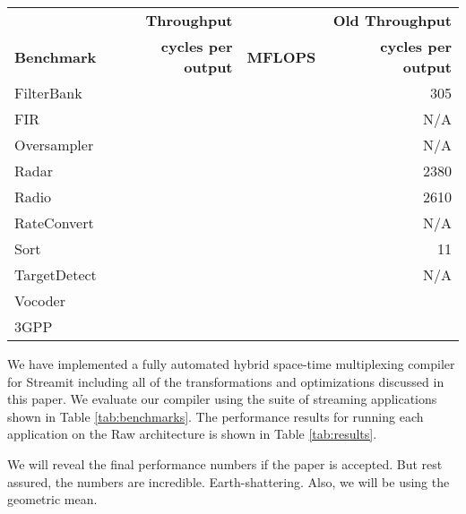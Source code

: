 \begin{table*}[t]
\begin{center}
\scriptsize
\begin{tabular}{|l||r|r||r||}\hline
& {\bf Throughput} &  & {\bf Old Throughput}\\
{\bf Benchmark} &  {\bf cycles per output} & {\bf MFLOPS} &  {\bf cycles per output}\\ 
\hline \hline
FilterBank & & & 305 \\ \hline
FIR & & & N/A\\ \hline
Oversampler & & & N/A \\ \hline
Radar & & & 2380 \\ \hline
Radio & & & 2610 \\ \hline
RateConvert & & & N/A\\ \hline
Sort & & & 11 \\ \hline
TargetDetect & & & N/A\\ \hline
Vocoder & & & \\ \hline
3GPP& & & \\ \hline
\hline
\end{tabular}
\caption{\protect\small Performance Results.}
\label{tab:results}
\end{center}
\end{table*}

We have implemented a fully automated hybrid space-time multiplexing
compiler for Streamit including all of the transformations and
optimizations discussed in this paper.  We evaluate our compiler using
the suite of streaming applications shown in Table
\ref{tab:benchmarks}.  The performance results for running each
application on the Raw architecture is shown in Table
\ref{tab:results}.

We will reveal the final performance numbers if the paper is
accepted.  But rest assured, the numbers are incredible.
Earth-shattering. Also, we will be using the geometric mean.
